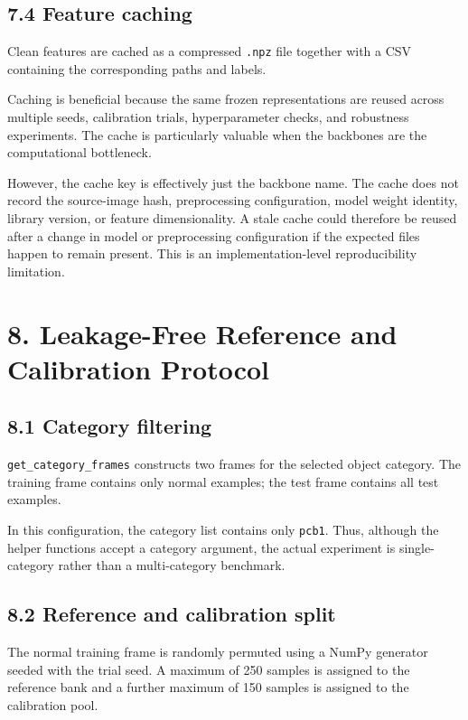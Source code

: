 \documentclass[
  11pt,
]{article}
\begin{document}
\subsection{7.4 Feature caching}\label{feature-caching}

Clean features are cached as a compressed \texttt{.npz} file together
with a CSV containing the corresponding paths and labels.

Caching is beneficial because the same frozen representations are reused
across multiple seeds, calibration trials, hyperparameter checks, and
robustness experiments. The cache is particularly valuable when the
backbones are the computational bottleneck.

However, the cache key is effectively just the backbone name. The cache
does not record the source-image hash, preprocessing configuration,
model weight identity, library version, or feature dimensionality. A
stale cache could therefore be reused after a change in model or
preprocessing configuration if the expected files happen to remain
present. This is an implementation-level reproducibility limitation.

\section{8. Leakage-Free Reference and Calibration
Protocol}\label{leakage-free-reference-and-calibration-protocol}

\subsection{8.1 Category filtering}\label{category-filtering}

\texttt{get\_category\_frames} constructs two frames for the selected
object category. The training frame contains only normal examples; the
test frame contains all test examples.

In this configuration, the category list contains only
\texttt{pcb1}. Thus, although the helper functions accept a category
argument, the actual experiment is single-category rather than a
multi-category benchmark.

\subsection{8.2 Reference and calibration
split}\label{reference-and-calibration-split}

The normal training frame is randomly permuted using a NumPy generator
seeded with the trial seed. A maximum of 250 samples is assigned to the
reference bank and a further maximum of 150 samples is assigned to the
calibration pool.
\end{document}
